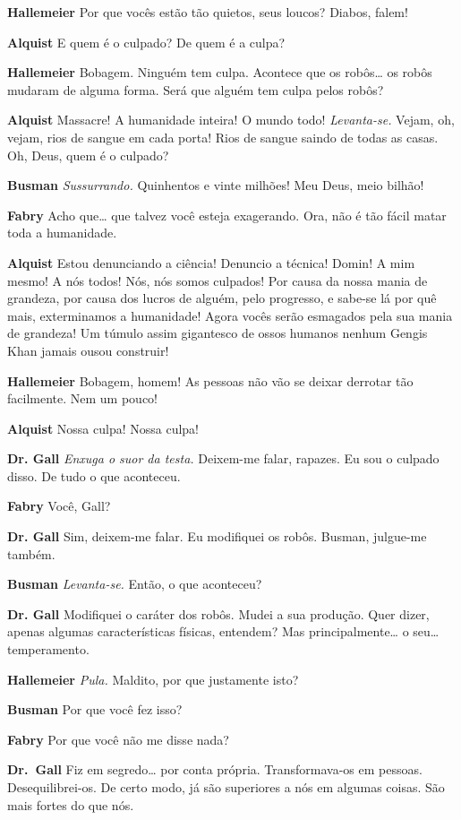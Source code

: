 \textbf{Hallemeier} Por que vocês estão tão quietos, seus loucos? Diabos, falem!

\textbf{Alquist} E quem é o culpado? De quem é a culpa?

\textbf{Hallemeier} Bobagem. Ninguém tem culpa. Acontece que os robôs\ldots{} os robôs
mudaram de alguma forma. Será que alguém tem culpa pelos robôs?

\textbf{Alquist} Massacre! A humanidade inteira! O mundo todo! \emph{Levanta-se.}
Vejam, oh, vejam, rios de sangue em cada porta! Rios de sangue saindo de
todas as casas. Oh, Deus, quem é o culpado?

\textbf{Busman} \emph{Sussurrando.} Quinhentos e vinte milhões! Meu Deus, meio bilhão!

\textbf{Fabry} Acho que\ldots{} que talvez você esteja exagerando. Ora, não é tão
fácil matar toda a humanidade.

\textbf{Alquist} Estou denunciando a ciência! Denuncio a técnica! Domin! A mim mesmo! A
nós todos! Nós, nós somos culpados! Por causa da nossa mania de grandeza, por
causa dos lucros de alguém, pelo progresso, e sabe-se lá por quê mais, 
exterminamos a humanidade! Agora vocês serão esmagados pela sua mania de grandeza! Um
túmulo assim gigantesco de ossos humanos nenhum Gengis Khan jamais ousou construir!

\textbf{Hallemeier} Bobagem, homem! As pessoas não vão se deixar derrotar tão
facilmente. Nem um pouco!

\textbf{Alquist} Nossa culpa! Nossa culpa!

\textbf{Dr. Gall} \emph{Enxuga o suor da testa.} Deixem-me falar, rapazes. Eu sou o
culpado disso. De tudo o que aconteceu.

\textbf{Fabry} Você, Gall?

\textbf{Dr. Gall} Sim, deixem-me falar. Eu modifiquei os robôs. Busman, julgue-me
também.

\textbf{Busman} \emph{Levanta-se.} Então, o que aconteceu?

\textbf{Dr. Gall} Modifiquei o caráter dos robôs. Mudei a sua produção. Quer dizer,
apenas algumas características físicas, entendem? Mas principalmente\ldots{} o seu\ldots{}
temperamento.

\textbf{Hallemeier} \emph{Pula.} Maldito, por que justamente isto?

\textbf{Busman} Por que você fez isso?

\textbf{Fabry} Por que você não me disse nada?

\textbf{Dr.~Gall} Fiz em segredo\ldots{} por conta própria. Transformava-os em
pessoas. Desequilibrei-os. De certo modo, já são superiores a nós em algumas coisas. São
mais fortes do que nós.

